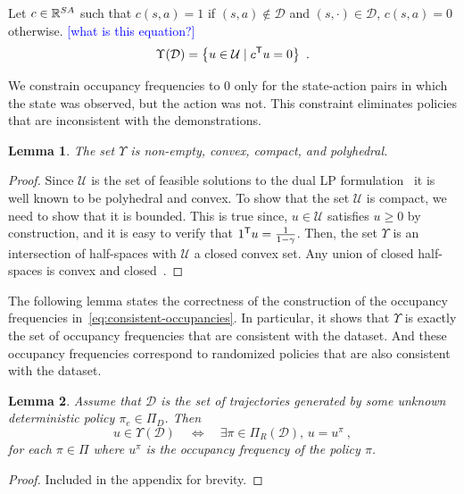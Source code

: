 \documentclass[11pt]{uai2023}
\newtheorem{lemma}{Lemma}
\newcommand{\mm}[1]{\textcolor{blue}{[#1]}}
\begin{document}
Let $c \in \mathbb{R}^{SA}$ such that $c(s,a) = 1$ if $(s,a) \notin \mathcal{D}$ and $(s, \cdot) \in \mathcal{D}$, $c(s,a)  = 0$ otherwise. \mm{what is this equation?}
%
\begin{equation}\label{eq:consistent-occupancies}
	\Upsilon(\mathcal{D}) = \left\{ u \in \mathcal{U} \mid c^{\mathsf{T}} u = 0  \right\}~.
\end{equation}


We constrain occupancy frequencies to 0 only for the state-action pairs in which the state was observed, but the action was not. This constraint eliminates policies that are inconsistent with the demonstrations.
%
\begin{lemma}\label{prop:convexity_of_Upsilon}
The set $\Upsilon$ is non-empty, convex, compact, and polyhedral.
\end{lemma}
\begin{proof}
Since $\mathcal{U}$ is the set of feasible solutions to the dual LP formulation~\cite[Eq.~(6.9.2)]{Puterman1994} it is well known to be polyhedral and convex. To show that the set $\mathcal{U}$ is compact, we need to show that it is bounded. This is true since, $u \in \mathcal{U}$ satisfies $u \ge 0$ by construction, and it is easy to verify that $1^{\mathsf{T}} u = \frac{1}{1-\gamma}$. Then, the set $\Upsilon$ is an intersection of half-spaces with $\mathcal{U}$ a closed convex set. Any union of closed half-spaces is convex and closed~\cite[eq.~(2.2.1)]{boyd_convex_optimization}.
\end{proof}

The following lemma states the correctness of the construction of the occupancy frequencies in~\eqref{eq:consistent-occupancies}. In particular, it shows that $\Upsilon$ is exactly the set of occupancy frequencies that are consistent with the dataset. And these occupancy frequencies correspond to randomized policies that are also consistent with the dataset.

\begin{lemma}\label{lemma:occ_freq_matching}
	Assume that $\mathcal{D}$ is the set of trajectories generated by some unknown deterministic policy $\pi_e \in \Pi_D$. Then
	\[
		u \in \Upsilon(\mathcal{D})  \quad \Leftrightarrow \quad  \exists \pi \in \Pi_R(\mathcal{D}), \, u = u^{\pi}~,
	\]
	for each $\pi \in \Pi$ where $u^{\pi}$ is the occupancy frequency of the policy $\pi$.
\end{lemma}
\begin{proof}
	Included in the appendix for brevity.
\end{proof}
\end{document}
